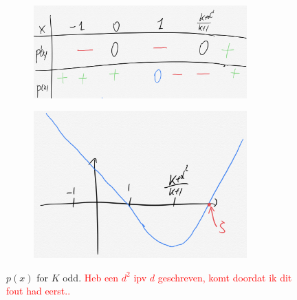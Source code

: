 \documentclass[12pt]{report}
\begin{document}
\begin{figure}[t]
\begin{subfigure}{.45\textwidth}
\centering
\captionsetup{width=.8\linewidth}
\includegraphics[width=0.9\textwidth]{figures/Chapter8/tekenschema_Kodd.png}
\label{fig:tails_SQd}
\end{subfigure}
\begin{subfigure}{.45\textwidth}
\centering
\captionsetup{width=.8\linewidth}
\includegraphics[width=0.9\textwidth]{figures/Chapter8/plot_Kodd.png}
\end{subfigure}
\caption{$p(x)$ for $K$ odd. \textcolor{red}{Heb een $d^2$ ipv $d$ geschreven, komt doordat ik dit fout had eerst..}} \label{fig:Kodd}
\end{figure}
\end{document}
